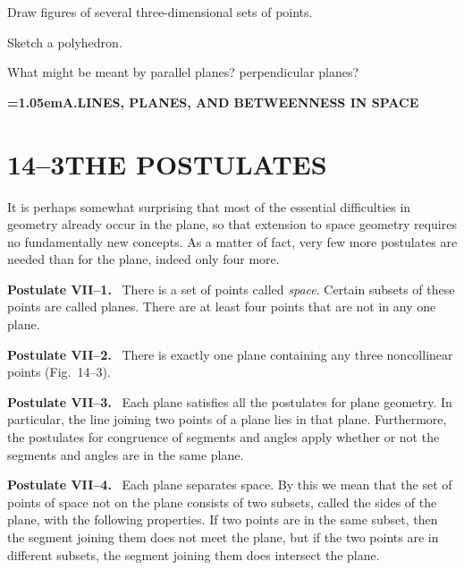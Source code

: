 \documentclass[11pt]{book}
\newcommand{\XIVpart}[1]{%
  \par\addvspace{1.5\baselineskip}\nopagebreak
  \begin{center}\bfseries\spaceskip=1.05em\relax #1\end{center}%
  \nopagebreak\addvspace{0.8\baselineskip}}
\newenvironment{postulate}[1]%
  {\par\addvspace{1.1\topsep}\noindent\textbf{Postulate #1.}\ \ignorespaces}%
  {\par\addvspace{1.1\topsep}}
\begin{document}
\FIGXIVONE

\FIGXIVTWO

\begin{exercisecols}
\begin{exlist}
\item Draw figures of several three-dimensional sets of points.
\item Sketch a polyhedron.
\item What might be meant by parallel planes? perpendicular planes?
\end{exlist}
\end{exercisecols}

\XIVpart{A.\quad LINES, PLANES, AND BETWEENNESS IN SPACE}

\section*{14--3\quad THE POSTULATES}

It is perhaps somewhat surprising that most of the essential difficulties in
geometry already occur in the plane, so that extension to space geometry
requires no fundamentally new concepts. As a matter of fact, very few more
postulates are needed than for the plane, indeed only four more.

\begin{postulate}{VII--1}
There is a set of points called \emph{space}. Certain subsets of these points
are called planes. There are at least four points that are not in any one plane.
\end{postulate}

\begin{postulate}{VII--2}
There is exactly one plane containing any three noncollinear points
(Fig.~14--3).
\end{postulate}

\FIGXIVTHREE

\begin{postulate}{VII--3}
Each plane satisfies all the postulates for plane geometry. In particular, the
line joining two points of a plane lies in that plane. Furthermore, the
postulates for congruence of segments and angles apply whether or not the
segments and angles are in the same plane.
\end{postulate}

\begin{postulate}{VII--4}
Each plane separates space. By this we mean that the set of points of space not
on the plane consists of two subsets, called the sides of the plane, with the
following properties. If two points are in the same subset, then the segment
joining them does not meet the plane, but if the two points are in different
subsets, the segment joining them does intersect the plane.
\end{postulate}
\end{document}
